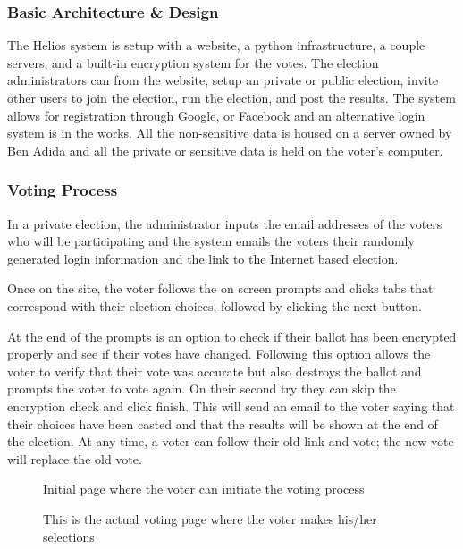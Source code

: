 \subsubsection{Basic Architecture \& Design}

The Helios system is setup with a website, a python infrastructure, a
couple servers, and a built-in encryption system for the votes. The
election administrators can from the website, setup an private or
public election, invite other users to join the election, run the
election, and post the results. The system allows for registration
through Google, or Facebook and an alternative login system is in the
works. All the non-sensitive data is housed on a server owned by Ben
Adida and all the private or sensitive data is held on the voter's
computer.

\subsubsection{Voting Process}

In a private election, the administrator inputs the email addresses of
the voters who will be participating and the system emails the voters
their randomly generated login information and the link to the
Internet based election.

Once on the site, the voter follows the on screen prompts and clicks
tabs that correspond with their election choices, followed by clicking
the next button.

At the end of the prompts is an option to check if their ballot has
been encrypted properly and see if their votes have changed. Following
this option allows the voter to verify that their vote was accurate
but also destroys the ballot and prompts the voter to vote again. On
their second try they can skip the encryption check and click
finish. This will send an email to the voter saying that their choices
have been casted and that the results will be shown at the end of the
election. At any time, a voter can follow their old link and vote; the
new vote will replace the old vote.

\begin{figure}
  \centering {}
  \caption{Initial page where the voter can initiate the voting
    process}
  \label{fig:helios-initial}
\end{figure}

\begin{figure}
  \centering {}
  \caption{This is the actual voting page where the voter makes
    his/her selections}
  \label{fig:helios-voting}
\end{figure}

